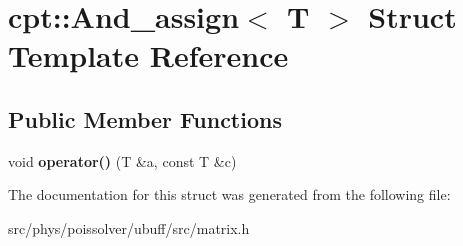 \hypertarget{structcpt_1_1And__assign}{}\section{cpt\+:\+:And\+\_\+assign$<$ T $>$ Struct Template Reference}
\label{structcpt_1_1And__assign}
\subsection*{Public Member Functions}
\begin{DoxyCompactItemize}
\item 
void {\bfseries operator()} (T \&a, const T \&c)\hypertarget{structcpt_1_1And__assign_acf0857c50d6b7c897aaad391d2d3dc81}{}\label{structcpt_1_1And__assign_acf0857c50d6b7c897aaad391d2d3dc81}

\end{DoxyCompactItemize}


The documentation for this struct was generated from the following file\+:\begin{DoxyCompactItemize}
\item 
src/phys/poissolver/ubuff/src/matrix.\+h\end{DoxyCompactItemize}
